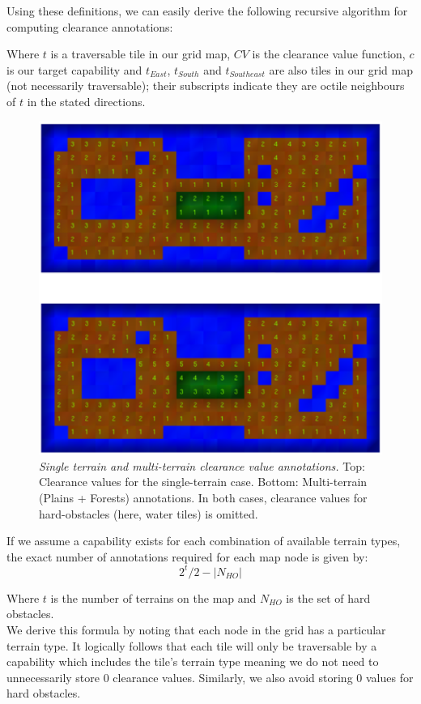 Using these definitions, we can easily derive the following recursive algorithm for computing clearance annotations:



Where $t$ is a traversable tile in our grid map, $CV$ is the clearance value function, $c$ is our target capability and $t_{East}$, $t_{South}$ and $t_{Southeast}$ are also tiles in our grid map (not necessarily traversable); their  subscripts indicate they are octile neighbours of $t$ in the stated directions.

\begin{figure}[htbp]
        \caption{\emph{Single terrain and multi-terrain clearance value annotations.} Top: Clearance values for the single-terrain case. Bottom: Multi-terrain (Plains + Forests) annotations. In both cases, clearance values for hard-obstacles (here, water tiles) is omitted.}
        \begin{center}
                        \includegraphics[scale=0.4]{diagrams/annotations.eps}
        \end{center}
        \label{aha-fig:annotations}
\end{figure}

If we assume a capability exists for each combination of available terrain types, the exact number of annotations required for each map node is given by:
\begin{equation}
2^t/2 - |N_{HO}|
\label{aha-eq:gridannotations}
\end{equation}

Where $t$ is the number of terrains on the map and $N_{HO}$ is the set of hard obstacles. \\ \newline
We derive this formula by noting that each node in the grid has a particular terrain type. It logically follows that each tile will only be traversable by a capability which includes the tile's terrain type meaning we do not need to unnecessarily store 0 clearance values. Similarly, we also avoid storing 0 values for hard obstacles.

